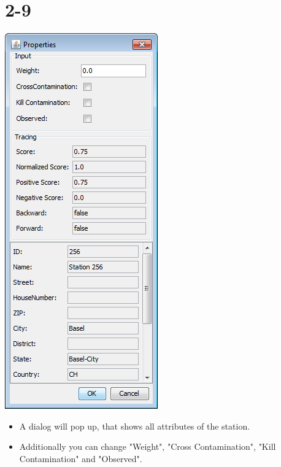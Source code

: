 \documentclass{beamer}
\begin{document}
\section{2-9}
\begin{frame}
	\begin{center}
  		\includegraphics[height=0.6\textheight]{2-9.png}
	\end{center}
	\begin{itemize}
		\item A dialog will pop up, that shows all attributes of the station.
		\item Additionally you can change "Weight", "Cross Contamination", "Kill Contamination" and "Observed".
	\end{itemize}
\end{frame}
\end{document}

